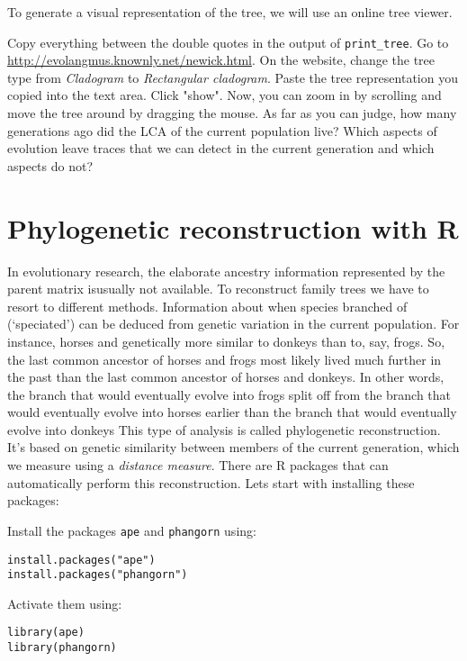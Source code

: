 \documentclass[a4paper, 9pt]{article}
\begin{document}
To generate a visual representation of the tree, we will use an online
tree viewer.

\begin{exercise}
\action Copy everything between the double quotes in the output of \texttt{print\_tree}. 
\action Go to \url{http://evolangmus.knownly.net/newick.html}. 
\action On the website, change the tree type from \textit{Cladogram} to \textit{Rectangular cladogram}.
\action Paste the tree representation you copied into the text area. 
\action Click "show". Now, you can zoom in by scrolling and move the tree around by dragging the mouse.
\askstar As far as you can judge, how many generations ago did the LCA of the current population live?
\askstar Which aspects of evolution leave traces that we can detect in the current generation and which aspects do not?
\end{exercise}

\section{Phylogenetic reconstruction with
R}\label{phylogenetic-reconstruction-with-r}

In evolutionary research, the elaborate ancestry information represented
by the parent matrix isusually not available. To reconstruct family
trees we have to resort to different methods. Information about when
species branched of (`speciated') can be deduced from genetic variation
in the current population. For instance, horses and genetically more
similar to donkeys than to, say, frogs. So, the last common ancestor of
horses and frogs most likely lived much further in the past than the
last common ancestor of horses and donkeys. In other words, the branch
that would eventually evolve into frogs split off from the branch that
would eventually evolve into horses earlier than the branch that would
eventually evolve into donkeys This type of analysis is called
phylogenetic reconstruction. It's based on genetic similarity between
members of the current generation, which we measure using a
\emph{distance measure}. There are R packages that can automatically
perform this reconstruction. Lets start with installing these packages:

\begin{exercise}
    \action Install the packages \texttt{ape} and \texttt{phangorn} using:\begin{lstlisting}
install.packages("ape")
install.packages("phangorn")      
\end{lstlisting}
Activate them using:\begin{lstlisting}
library(ape)
library(phangorn)
\end{lstlisting}
\end{exercise}
\end{document}
